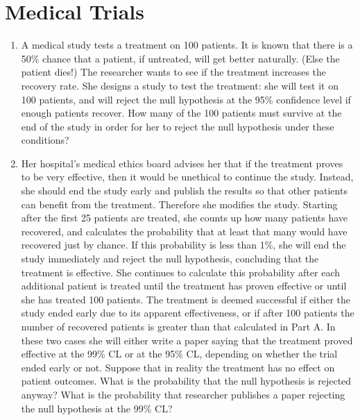 \section{Medical Trials}

\begin{enumerate}[label=\textbf{\Alph*}.]
    \item A medical study tests a treatment on 100 patients. It is known that there is a 50\% chance that a patient, if untreated, will get better naturally. (Else the patient dies!) The researcher wants to see if the treatment increases the recovery rate. She designs a study to test the treatment: she will test it on 100 patients, and will reject the null hypothesis at the 95\% confidence level if enough patients recover. How many of the 100 patients must survive at the end of the study in order for her to reject the null hypothesis under these conditions?

    \item Her hospital's medical ethics board advises her that if the treatment proves to be very effective, then it would be unethical to continue the study. Instead, she should end the study early and publish the results so that other patients can benefit from the treatment. Therefore she modifies the study. Starting after the first 25 patients are treated, she counts up how many patients have recovered, and calculates the probability that at least that many would have recovered just by chance. If this probability is less than 1\%, she will end the study immediately and reject the null hypothesis, concluding that the treatment is effective. She continues to calculate this probability after each additional patient is treated until the treatment has proven effective or until she has treated 100 patients. The treatment is deemed successful if either the study ended early due to its apparent effectiveness, or if after 100 patients the number of recovered patients is greater than that calculated in Part A. In these two cases she will either write a paper saying that the treatment proved effective at the 99\% CL or at the 95\% CL, depending on whether the trial ended early or not. Suppose that in reality the treatment has no effect on patient outcomes. What is the probability that the null hypothesis is rejected anyway? What is the probability that researcher publishes a paper rejecting the null hypothesis at the 99\% CL?

\end{enumerate}
